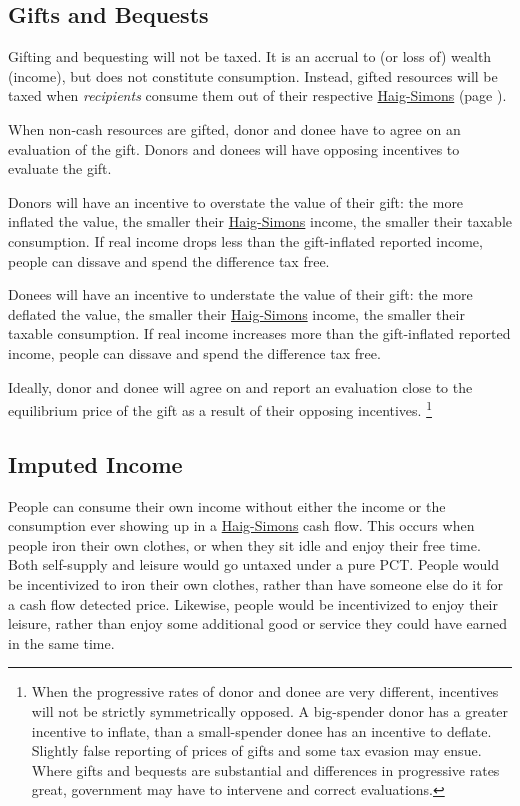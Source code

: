 \subsection{Gifts and Bequests}
Gifting and bequesting will not be taxed.
It is an accrual to (or loss of) wealth (income), but does not constitute consumption.
Instead, gifted resources will be taxed when \emph{recipients} consume them out of their respective \hyperref[eq:HaigSimonsPCT]{Haig-Simons} (page \pageref{eq:HaigSimonsPCT}).

When non-cash resources are gifted, donor and donee have to agree on an evaluation of the gift.
Donors and donees will have opposing incentives to evaluate the gift.

Donors will have an incentive to overstate the value of their gift:
the more inflated the value, the smaller their \hyperref[eq:HaigSimonsPCT]{Haig-Simons} income, the smaller their taxable consumption.
If real income drops less than the gift-inflated reported income, people can dissave and spend the difference tax free.

Donees will have an incentive to understate the value of their gift:
the more deflated the value, the smaller their \hyperref[eq:HaigSimonsPCT]{Haig-Simons} income, the smaller their taxable consumption.
If real income increases more than the gift-inflated reported income, people can dissave and spend the difference tax free.

Ideally, donor and donee will agree on and report an evaluation close to the equilibrium price of the gift as a result of their opposing incentives.
\footnote{
	When the progressive rates of donor and donee are very different, incentives will not be strictly symmetrically opposed.
	A big-spender donor has a greater incentive to inflate, than a small-spender donee has an incentive to deflate.
	Slightly false reporting of prices of gifts and some tax evasion may ensue.
	Where gifts and bequests are substantial and differences in progressive rates great, government may have to intervene and correct evaluations.
}

\subsection{Imputed Income}
People can consume their own income without either the income or the consumption ever showing up in a \hyperref[eq:HaigSimonsPCT]{Haig-Simons} cash flow.
This occurs when people iron their own clothes, or when they sit idle and enjoy their free time.
Both self-supply and leisure would go untaxed under a pure PCT.
People would be incentivized to iron their own clothes, rather than have someone else do it for a cash flow detected price.
Likewise, people would be incentivized to enjoy their leisure, rather than enjoy some additional good or service they could have earned in the same time.

